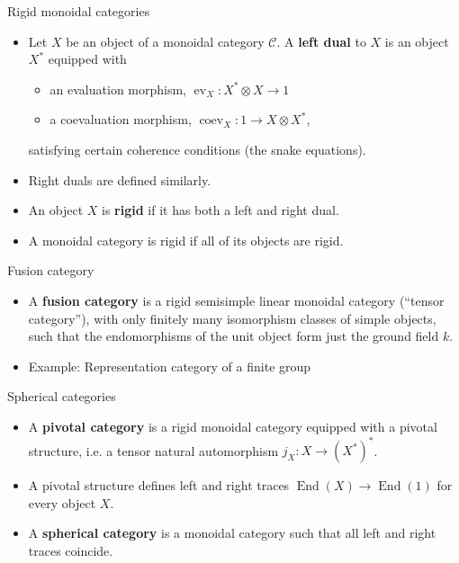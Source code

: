 \documentclass{beamer}
\DeclareMathOperator{\ev}{ev}
\DeclareMathOperator{\coev}{coev}
\DeclareMathOperator{\End}{End}
\begin{document}
\begin{frame}{Rigid monoidal categories}
\begin{itemize}
\item Let $X$ be an object of a monoidal category $\mathcal C$. A \textbf{left dual} to $X$ is an object $X^*$ equipped with 
\begin{itemize}
\item an evaluation morphism, $\ev_X : X^* \otimes X \to 1$
\item a coevaluation morphism, $\coev_X: 1 \to X \otimes X^*$,
\end{itemize}
satisfying certain coherence conditions (the snake equations).

\pause 
\item Right duals are defined similarly. 
\item An object $X$ is \textbf{rigid} if it
has both a left and right dual.  
\item A monoidal category is rigid if all of
its objects are rigid.
\end{itemize}
\end{frame}

\begin{frame}{Fusion category}
\begin{itemize}
\item A \textbf{fusion category} is a rigid semisimple linear monoidal category (“tensor category”), with only finitely many isomorphism classes of simple objects, such that the endomorphisms of the unit object form just the ground field $k$.

\pause
\item Example: Representation category of a finite group
\end{itemize}
\end{frame}

\begin{frame}{Spherical categories}
\begin{itemize}
\item A \textbf{pivotal category} is a rigid monoidal category equipped with
a pivotal structure, i.e. a tensor natural automorphism $j_X : X \to (X^*)^*$.  

\item A pivotal structure defines left and right traces $\End(X) \to \End(1)$ for every object $X$. 

\pause

\item A \textbf{spherical category} is a monoidal category such that all left and right traces coincide.
\end{itemize}
\end{frame}
\end{document}
